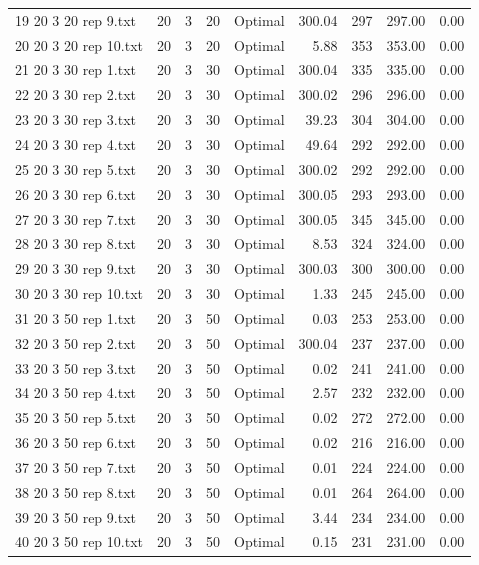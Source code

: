 \begin{longtable}{lrrllrrrr}
19 20 3 20 rep 9.txt & 20 & 3 & 20 & Optimal & 300.04 & 297 & 297.00 &  0.00\\
20 20 3 20 rep 10.txt & 20 & 3 & 20 & Optimal &  5.88 & 353 & 353.00 &  0.00\\
21 20 3 30 rep 1.txt & 20 & 3 & 30 & Optimal & 300.04 & 335 & 335.00 &  0.00\\
22 20 3 30 rep 2.txt & 20 & 3 & 30 & Optimal & 300.02 & 296 & 296.00 &  0.00\\
23 20 3 30 rep 3.txt & 20 & 3 & 30 & Optimal & 39.23 & 304 & 304.00 &  0.00\\
24 20 3 30 rep 4.txt & 20 & 3 & 30 & Optimal & 49.64 & 292 & 292.00 &  0.00\\
25 20 3 30 rep 5.txt & 20 & 3 & 30 & Optimal & 300.02 & 292 & 292.00 &  0.00\\
26 20 3 30 rep 6.txt & 20 & 3 & 30 & Optimal & 300.05 & 293 & 293.00 &  0.00\\
27 20 3 30 rep 7.txt & 20 & 3 & 30 & Optimal & 300.05 & 345 & 345.00 &  0.00\\
28 20 3 30 rep 8.txt & 20 & 3 & 30 & Optimal &  8.53 & 324 & 324.00 &  0.00\\
29 20 3 30 rep 9.txt & 20 & 3 & 30 & Optimal & 300.03 & 300 & 300.00 &  0.00\\
30 20 3 30 rep 10.txt & 20 & 3 & 30 & Optimal &  1.33 & 245 & 245.00 &  0.00\\
31 20 3 50 rep 1.txt & 20 & 3 & 50 & Optimal &  0.03 & 253 & 253.00 &  0.00\\
32 20 3 50 rep 2.txt & 20 & 3 & 50 & Optimal & 300.04 & 237 & 237.00 &  0.00\\
33 20 3 50 rep 3.txt & 20 & 3 & 50 & Optimal &  0.02 & 241 & 241.00 &  0.00\\
34 20 3 50 rep 4.txt & 20 & 3 & 50 & Optimal &  2.57 & 232 & 232.00 &  0.00\\
35 20 3 50 rep 5.txt & 20 & 3 & 50 & Optimal &  0.02 & 272 & 272.00 &  0.00\\
36 20 3 50 rep 6.txt & 20 & 3 & 50 & Optimal &  0.02 & 216 & 216.00 &  0.00\\
37 20 3 50 rep 7.txt & 20 & 3 & 50 & Optimal &  0.01 & 224 & 224.00 &  0.00\\
38 20 3 50 rep 8.txt & 20 & 3 & 50 & Optimal &  0.01 & 264 & 264.00 &  0.00\\
39 20 3 50 rep 9.txt & 20 & 3 & 50 & Optimal &  3.44 & 234 & 234.00 &  0.00\\
40 20 3 50 rep 10.txt & 20 & 3 & 50 & Optimal &  0.15 & 231 & 231.00 &  0.00\\

\end{longtable}

